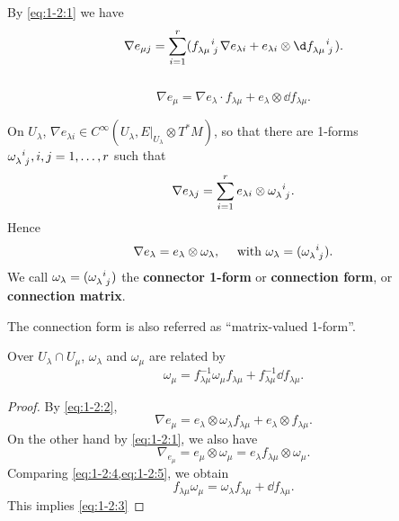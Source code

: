 \documentclass[12pt]{article}
\begin{document}
By \cref{eq:1-2:1} we have \[
    \nabla e_{\mu j}=\sum_{i=1}^{r}(\tensor{f}{_\lambda_\mu^i_j}\nabla 
    e_{\lambda i}+e_{\lambda i}\otimes \dd{\tensor{f}{_\lambda_\mu^i_j}})
.\] \ie\ 
\begin{equation}\label{eq:1-2:2}
    \nabla e_\mu=\nabla e_\lambda\cdot f_{\lambda\mu}+e_\lambda\otimes 
    \dd{f_{\lambda\mu}}
.\end{equation}

\begin{definition}
    On \(U_\lambda\), \(\nabla e_{\lambda i} \in C^\infty(U_\lambda,
    E\Big|_{U_\lambda}\otimes T^*M)\), so that there are 1-forms
    \(\tensor{\omega}{_\lambda^i_j}, i,j=1,\ldots,r\) such that \[
        \nabla e_{\lambda j}=\sum_{i=1}^{r}e_{\lambda i}\otimes 
        \tensor{\omega}{_\lambda^i_j}
    .\] Hence \[
        \nabla e_\lambda=e_\lambda\otimes \omega_\lambda, \quad
        \text{ with }\omega_\lambda=(\tensor{\omega}{_\lambda^i_j})
    .\] We call \(\omega_\lambda=(\tensor{\omega}{_\lambda^i_j})\) the
    \textbf{connector 1-form} or \textbf{connection form}, or
    \textbf{connection matrix}.
\end{definition}
The connection form is also referred as ``matrix-valued 1-form''.

\begin{prop}\label{thm:1-2:prop2}
    Over \(U_\lambda\cap U_\mu\), \(\omega_\lambda\) and \(\omega_\mu\)
    are related by
    \begin{equation}\label{eq:1-2:3}
        \omega_\mu=f_{\lambda\mu}^{-1}\omega_\mu f_{\lambda\mu}
        +f_{\lambda\mu}^{-1}\dd{f_{\lambda\mu}}
    .\end{equation}
\end{prop}
\begin{proof}
    By \cref{eq:1-2:2},
    \begin{equation}\label{eq:1-2:4}
        \nabla e_\mu=e_\lambda\otimes \omega_\lambda f_{\lambda\mu}
        +e_{\lambda}\otimes f_{\lambda\mu}
    .\end{equation}
    On the other hand by \cref{eq:1-2:1}, we also have
    \begin{equation}\label{eq:1-2:5}
        \nabla_{e_\mu}=e_{\mu}\otimes \omega_\mu
        =e_\lambda f_{\lambda\mu}\otimes \omega_\mu
    .\end{equation}
    Comparing \cref{eq:1-2:4,eq:1-2:5}, we obtain \[
        f_{\lambda\mu}\omega_\mu=\omega_\lambda f_{\lambda\mu}
        +\dd{f_{\lambda\mu}}
    .\] This implies \cref{eq:1-2:3}
\end{proof}
\end{document}
